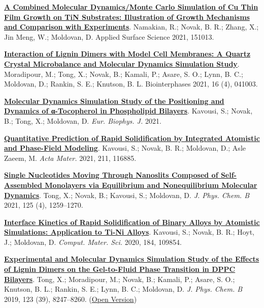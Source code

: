 
\begin{cventries}
  \cventry
    {} %
    {} %
    {} %
    {} %
    {
      \begin{cvitems} %
        \item{\href{https://authors.elsevier.com/c/1dlt0cXa~yxmX}{\textbf{A Combined Molecular Dynamics/Monte Carlo Simulation of Cu Thin Film Growth on TiN Substrates: Illustration of Growth Mechanisms and Comparison with Experiments}}. Namakian, R.; Novak, B. R.; Zhang, X.; Jin Meng, W.; Moldovan, D. Applied Surface Science 2021, 151013.}
        \item{\href{https://doi.org/10.1116/6.0001029}{\textbf{Interaction of Lignin Dimers with Model Cell Membranes: A Quartz Crystal Microbalance and Molecular Dynamics Simulation Study}}. Moradipour, M.; Tong, X.; Novak, B.; Kamali, P.; Asare, S. O.; Lynn, B. C.; Moldovan, D.; Rankin, S. E.; Knutson, B. L. Biointerphases 2021, 16 (4), 041003.}
        \item {\href{https://rdcu.be/clAtY}{\textbf{Molecular Dynamics Simulation Study of the Positioning and Dynamics of α-Tocopherol in Phospholipid Bilayers}}. Kavousi, S.; Novak, B.; Tong, X.; Moldovan, D. \textit{Eur. Biophys. J.} 2021.}
        \item{\href{https://doi.org/10.1016/j.actamat.2021.116885}{\textbf{Quantitative Prediction of Rapid Solidification by Integrated Atomistic and Phase-Field Modeling}}. Kavousi, S.; Novak, B. R.; Moldovan, D.; Asle Zaeem, M. \textit{Acta Mater.} 2021, 211, 116885.}
        \item {\href{https://doi.org/10.1021/acs.jpcb.0c07797}{\textbf{Single Nucleotides Moving Through Nanoslits Composed of Self-Assembled Monolayers via Equilibrium and Nonequilibrium Molecular Dynamics}}. Tong, X.; Novak, B.; Kavousi, S.; Moldovan, D. \textit{J. Phys. Chem. B} 2021, 125 (4), 1259–1270.}
        \item {\href{https://doi.org/10.1016/j.commatsci.2020.109854}{\textbf{Interface Kinetics of Rapid Solidification of Binary Alloys by Atomistic Simulations: Application to Ti-Ni Alloys}}. Kavousi, S.; Novak, B. R.; Hoyt, J.; Moldovan, D. \textit{Comput. Mater. Sci.} 2020, 184, 109854.}
        \item {\href{https://doi.org/10.1021/acs.jpcb.9b05525}{\textbf{Experimental and Molecular Dynamics Simulation Study of the Effects of Lignin Dimers on the Gel-to-Fluid Phase Transition in DPPC Bilayers}}. Tong, X.; Moradipour, M.; Novak, B.; Kamali, P.; Asare, S. O.; Knutson, B. L.; Rankin, S. E.; Lynn, B. C.; Moldovan, D. \textit{J. Phys. Chem. B} 2019, 123 (39), 8247–8260. (\href{https://par.nsf.gov/servlets/purl/10149222}{Open Version})}

\end{cvitems}}
\end{cventries}

